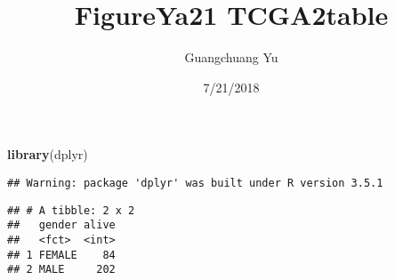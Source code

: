 \documentclass[]{article}
\title{FigureYa21 TCGA2table}
\author{Guangchuang Yu}
\date{7/21/2018}
\newenvironment{Shaded}{\begin{snugshade}}{\end{snugshade}}
\newcommand{\KeywordTok}[1]{\textcolor[rgb]{0.13,0.29,0.53}{\textbf{#1}}}
\newcommand{\DataTypeTok}[1]{\textcolor[rgb]{0.13,0.29,0.53}{#1}}
\newcommand{\StringTok}[1]{\textcolor[rgb]{0.31,0.60,0.02}{#1}}
\newcommand{\OperatorTok}[1]{\textcolor[rgb]{0.81,0.36,0.00}{\textbf{#1}}}
\newcommand{\NormalTok}[1]{#1}
\begin{document}
\maketitle

\begin{Shaded}
\begin{Highlighting}[]
\KeywordTok{library}\NormalTok{(dplyr)}
\end{Highlighting}
\end{Shaded}

\begin{verbatim}
## Warning: package 'dplyr' was built under R version 3.5.1
\end{verbatim}

\begin{Shaded}
\end{Shaded}

\begin{verbatim}
## # A tibble: 2 x 2
##   gender alive
##   <fct>  <int>
## 1 FEMALE    84
## 2 MALE     202
\end{verbatim}
\end{document}

